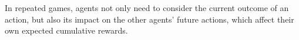 \documentclass[letterpaper, 10 pt, conference]{ieeeconf}  %
\begin{document}
In repeated games, agents not only need to consider the current outcome of an 
action, but also its impact on the other agents' future actions, which affect 
their own expected cumulative rewards. 




\vspace{-.2em}
\end{document}
